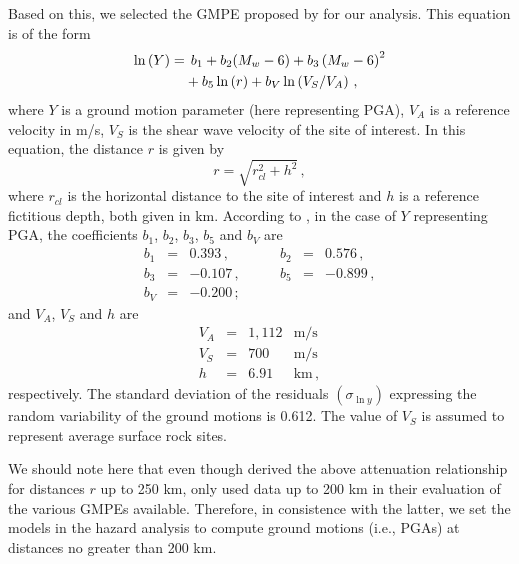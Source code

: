 Based on this, we selected the GMPE proposed by \citet{Kalkan2004} for our analysis. This equation is of the form
% 
\begin{align}
	\ln \left( Y \right) =
		& \hspace{1ex} b_1 + b_2(M_w - 6) + b_3 \left( M_w - 6 \right)^{2} \nonumber \\ 
		& + b_5 \ln \left( r \right) + b_V \ln \left( V_S / V_A \right)
	\, ,
\end{align}
% 
where $Y$ is a ground motion parameter (here representing PGA), $V_A$ is a reference velocity in m/s, $V_S$ is the shear wave velocity of the site of interest. In this equation, the distance $r$ is given by
% 
\begin{equation}
	r= \sqrt{ r^2_{\mathit{cl}} + h^2 }
	\, ,
\end{equation}
% 
where $r_{\mathit{cl}}$ is the horizontal distance to the site of interest and $h$ is a reference fictitious depth, both given in km. According to \citet{Kalkan2004}, in the case of $Y$ representing PGA, the coefficients $b_1$, $b_2$, $b_3$, $b_5$ and $b_V$ are
% 
\begin{equation}
\begin{array}{lcrlcr} 
	b_1 &=&  0.393   \,,&\hspace{2em}   b_2 &=& 0.576\,,   \\
	b_3 &=& -0.107   \,,&\hspace{2em}   b_5 &=& -0.899\,,  \\
	b_V &=& -0.200   \,; 
	\nonumber
\end{array}
\end{equation}
% 
and $V_A$, $V_S$ and $h$ are
% 
\begin{equation}
\begin{array}{lcrl} 
	V_A &=& 1,112 & \mathrm{m/s}	\\
	V_S &=&   700 & \mathrm{m/s}	\\
	h   &=&  6.91 & \mathrm{km}\,,
	\nonumber
\end{array}
\end{equation}
% 
respectively. The standard deviation of the residuals $(\sigma_{\ln y})$ expressing the random variability of the ground motions is 0.612. The value of $V_S$ is assumed to represent average surface rock sites.

We should note here that even though \citet{Kalkan2004} derived the above attenuation relationship for distances $r$ up to 250 km, \citet{Zafarani2014} only used data up to 200 km in their evaluation of the various GMPEs available. Therefore, in consistence with the latter, we set the models in the hazard analysis to compute ground motions (i.e., PGAs) at distances no greater than 200 km.


